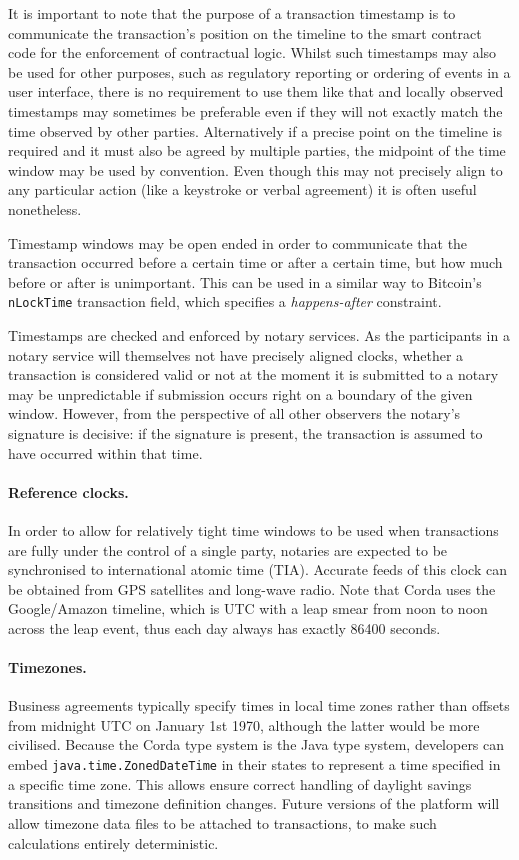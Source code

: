 \documentclass{article}
\begin{document}
It is important to note that the purpose of a transaction timestamp is to communicate the transaction's position on
the timeline to the smart contract code for the enforcement of contractual logic. Whilst such timestamps may also
be used for other purposes, such as regulatory reporting or ordering of events in a user interface, there is no
requirement to use them like that and locally observed timestamps may sometimes be preferable even if they will not
exactly match the time observed by other parties. Alternatively if a precise point on the timeline is required and
it must also be agreed by multiple parties, the midpoint of the time window may be used by convention. Even though
this may not precisely align to any particular action (like a keystroke or verbal agreement) it is often useful
nonetheless.

Timestamp windows may be open ended in order to communicate that the transaction occurred before a certain time or
after a certain time, but how much before or after is unimportant. This can be used in a similar way to Bitcoin's
\texttt{nLockTime} transaction field, which specifies a \emph{happens-after} constraint.

Timestamps are checked and enforced by notary services. As the participants in a notary service will themselves not
have precisely aligned clocks, whether a transaction is considered valid or not at the moment it is submitted to a
notary may be unpredictable if submission occurs right on a boundary of the given window. However, from the
perspective of all other observers the notary's signature is decisive: if the signature is present, the transaction
is assumed to have occurred within that time.

\paragraph{Reference clocks.}In order to allow for relatively tight time windows to be used when transactions are
fully under the control of a single party, notaries are expected to be synchronised to international atomic time
(TIA). Accurate feeds of this clock can be obtained from GPS satellites and long-wave radio. Note that Corda uses
the Google/Amazon timeline, which is UTC with a leap smear from noon to noon across the leap event, thus each day
always has exactly 86400 seconds.

\paragraph{Timezones.}Business agreements typically specify times in local time zones rather than offsets from
midnight UTC on January 1st 1970, although the latter would be more civilised. Because the Corda type system is the
Java type system, developers can embed \texttt{java.time.ZonedDateTime} in their states to represent a time
specified in a specific time zone. This allows ensure correct handling of daylight savings transitions and timezone
definition changes. Future versions of the platform will allow timezone data files to be attached to transactions,
to make such calculations entirely deterministic.
\end{document}
